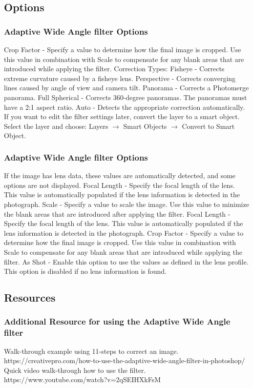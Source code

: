 \documentclass{beamer}
\begin{document}
				\subsection{Options}		
	\begin{frame}
		\frametitle{Adaptive Wide Angle filter Options}
		\begin{outline}
			\1 Crop Factor - Specify a value to determine how the final image is cropped. Use this value in combination with Scale to compensate for any blank areas that are introduced while applying the filter. 
			\1 Correction Types:
			\2 Fisheye - Corrects extreme curvature caused by a fisheye lens.
			\2 Perspective - Corrects converging lines caused by angle of view and camera tilt.
			\2 Panorama - Corrects a Photomerge panorama.
			\2 Full Spherical - Corrects 360-degree panoramas. The panoramas must have a 2:1 aspect ratio.
			\2 Auto - Detects the appropriate correction automatically.
			\1 If you want to edit the filter settings later, convert the layer to a smart object. Select the layer and choose:  Layers $\rightarrow$ Smart Objects $\rightarrow$ Convert to Smart Object.
		\end{outline}
	\end{frame}

\begin{frame}
	\frametitle{Adaptive Wide Angle filter Options}
	\begin{outline}
		\1 If the image has lens data, these values are automatically detected, and some options are not displayed.
		\1 Focal Length - Specify the focal length of the lens. This value is automatically populated if the lens information is detected in the photograph.
		\1 Scale - Specify a value to scale the image. Use this value to minimize the blank areas that are introduced after applying the filter.
		\1 Focal Length - Specify the focal length of the lens. This value is automatically populated
		if the lens information is detected in the photograph.
		\1 Crop Factor - Specify a value to determine how the final image is cropped. Use this value
		in combination with Scale to compensate for any blank areas that are introduced while applying the filter.
		\1 As Shot - Enable this option to use the values as defined in the lens profile. This option is disabled if no lens information is found.
	\end{outline}
\end{frame}

				\subsection{Resources}		
\begin{frame}
	\frametitle{Additional Resource for using the Adaptive Wide Angle filter}
	\begin{outline}
		\1 Walk-through example using 11-steps to correct an image.
		\2 https://creativepro.com/how-to-use-the-adaptive-wide-angle-filter-in-photoshop/
		\1 Quick video walk-through how to use the filter.
		\2 https://www.youtube.com/watch?v=2qSEIHXkFsM
	\end{outline}
\end{frame}
			
\end{document}
